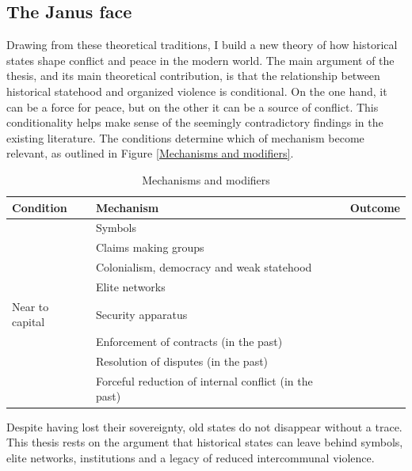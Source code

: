 \subsection{The Janus face}
\label{Janus}


Drawing from these theoretical traditions, I build a new theory of how
historical states shape conflict and peace in the modern world. The main
argument of the thesis, and its main theoretical contribution, is that the
relationship between historical statehood and organized violence is conditional.
On the one hand, it can be a force for peace, but on the other it can be a
source of conflict. This conditionality helps make sense of the seemingly
contradictory findings in the existing literature. The conditions determine
which of mechanism become relevant, as outlined in Figure \ref{Mechanisms and
modifiers}.

\begin{table}[hpbt]
	\begin{tabularx}{\textwidth}{>{\centering\arraybackslash}X>{\centering\arraybackslash}X>{\centering\arraybackslash}X}
	\textbf{Condition} & \textbf{Mechanism} & \textbf{Outcome} \\
\toprule
	\multirow{4}{=}{\centering{Number and far from capital}} & Symbols & \multirow{4}{=}{\centering{Conflict}} \\
    	\cmidrule{2-2}
	& Claims making groups & \\
    	\cmidrule{2-2}
	& Colonialism, democracy and weak statehood & \\
	\cmidrule{2-2}
	& Elite networks & \\
	\midrule
	Near to capital & Security apparatus & \multirow{5}{=}{\centering{Peace}} \\
		\cmidrule{1-2}
	\multirow{3}{=}{\centering{Type of violence}} & Enforcement of contracts
						      (in the past) & \\
		\cmidrule{2-2}
	& Resolution of disputes (in the past) & \\
		\cmidrule{2-2}
	& Forceful reduction of internal conflict (in the past) & \\
	\bottomrule
\end{tabularx}
\caption{Mechanisms and modifiers}
\label{Mechanisms and modifiers}
\end{table}

Despite having lost their sovereignty, old states do not disappear without a
trace. This thesis rests on the argument that historical states can leave behind
symbols, elite networks, institutions and a legacy of reduced intercommunal
violence. 

